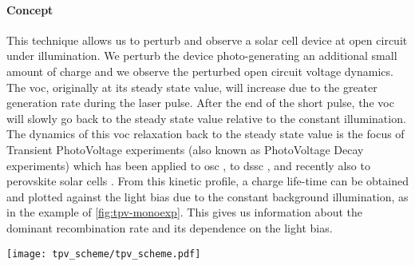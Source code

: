 	\paragraph{Concept}
	This technique allows us to perturb and observe a solar cell device at open circuit under illumination.
	We perturb the device photo\hyp{}generating an additional small amount of charge and we observe the perturbed open circuit voltage dynamics.
	The \gls{voc}, originally at its steady state value, will increase due to the greater generation rate during the laser pulse.
	After the end of the short pulse, the \gls{voc} will slowly go back to the steady state value relative to the constant illumination.
	The dynamics of this \gls{voc} relaxation back to the steady state value is the focus of Transient PhotoVoltage experiments (also known as PhotoVoltage Decay experiments) which has been applied to \gls{osc} \cite{Shuttle2008}, to \gls{dssc} \cite{ORegan2005,ORegan2004,ORegan2006}, and recently also to perovskite solar cells \cite{Roiati2014a,Marin-Beloqui2014}.
	From this kinetic profile, a charge life\hyp{}time can be obtained and plotted against the light bias due to the constant background illumination, as in the example of \cref{fig:tpv-monoexp}.
	This gives us information about the dominant recombination rate and its dependence on the light bias.

	\begin{SCfigure}
		\centering
		\texttt{[image: tpv\_scheme/tpv\_scheme.pdf]}
		\label{fig:tpv_scheme}
	\end{SCfigure}

